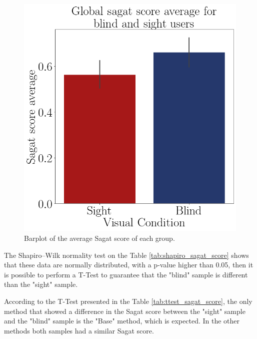 \begin{figure}[!htb]
\begin{minipage}{.45\linewidth}
        \vspace{1.8cm}
        \centering
        \includegraphics[width = \linewidth]{Resultados/Sagat/Figuras/png/barplot_sagat_avg_global.png}
        \caption{Barplot of the average Sagat score of each group.}
        \label{fig:barplot_sagat}
    \end{minipage}
\end{figure}

The Shapiro–Wilk normality test on the Table \ref{tab:shapiro_sagat_score} shows that these data are normally distributed, with a p-value higher than 0.05, then it is possible to perform a T-Test to guarantee that the "blind" sample is different than the "sight" sample.

According to the T-Test presented in the Table \ref{tab:ttest_sagat_score}, the only method that showed a difference in the Sagat score between the "sight" sample and the "blind" sample is the "Base" method, which is expected. In the other methods both samples had a similar Sagat score.

\begin{table}[!htb]
    \begin{minipage}{.45\linewidth}
        
    \end{minipage}
    \hfill
    \begin{minipage}{.45\linewidth}
        \vspace{-2.75cm}
        
    \end{minipage}
\end{table}


